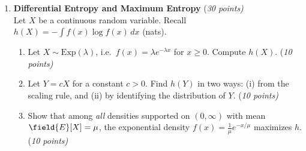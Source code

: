 \documentclass[12pt]{article}
\newcommand{\E}{\field{E}}
\renewcommand{\E}{\field{E}}
\begin{document}
\begin{enumerate}

\item {\bf Differential Entropy and Maximum Entropy} {(\it 30 points)}\\
Let $X$ be a continuous random variable. Recall $h(X) = -\int f(x)\log f(x)\,dx$ (nats).
\begin{enumerate}
\item Let $X \sim \mathrm{Exp}(\lambda)$, i.e.~$f(x) = \lambda e^{-\lambda x}$ for $x \ge 0$. Compute $h(X)$. {(\it 10 points)}
\item Let $Y = cX$ for a constant $c > 0$. Find $h(Y)$ in two ways: (i) from the scaling rule, and (ii) by identifying the distribution of $Y$. {(\it 10 points)}
\item Show that among \emph{all} densities supported on $(0,\infty)$ with mean $\E[X] = \mu$, the exponential density $f(x) = \frac1\mu e^{-x/\mu}$ maximizes $h$. {(\it 10 points)}
\end{enumerate}


\end{enumerate}
\end{document}
